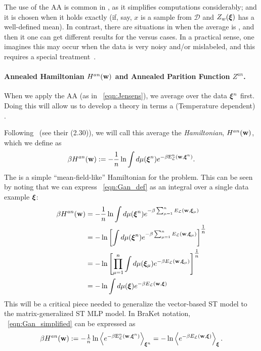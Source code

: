 The use of the AA is common in \STATMECH, as it simplifies computations considerably; and 
it is chosen when it holds exactly (if, say, $x$ is a \Typical sample from $\mathcal{D}$ and $Z_w(\boldsymbol{\xi})$ has a well-defined mean).
In contrast, there are situations in \STATMECH when the average is \ATypical, and then it one can get different results for the \Quenched versus \Annealed cases.  In a practical sense, one imagines this may occur when the data is very
noisy and/or mislabeled, and this requires a special treatment~\cite{SST92}.

\paragraph{Annealed Hamiltonian $H^{an}({\mathbf{w}})$ and Annealed Parition Function $Z^{an}$.}

When we apply the AA (as in \EQN~\ref{eqn:Jensens}), 
we average over the data $\boldsymbol{\xi}^{n}$ first. 
Doing this will allow us to develop a theory in terms a (Temperature dependent) \EffectivePotential. 

Following~\cite{SST92} (see their \EQN(2.30)), we will call this average the \emph{\Annealed Hamiltonian}, $H^{an}({\mathbf{w}})$, 
which we define as  %
  \begin{align}
   \label{eqn:Gan_def}
   \beta H^{an}({\mathbf{w}}):= - \frac{1}{n}\ln  \int d\mu(\boldsymbol{\xi}^{n})e^{-\beta\mathbf{\mathrm{E}}^{n}_{\mathcal{L}}(\mathbf{w}, \boldsymbol{\xi}^{n})}.
  \end{align}
The \AnnealedHamiltonian is a simple ``mean-field-like'' Hamiltonian for the problem.
This can be seen by noting that we can express \EQN~\ref{eqn:Gan_def} as an integral over a single data example $\boldsymbol{\xi}$:
 \begin{align}
   \nonumber
   \beta H^{an}({\mathbf{w}}) &=  - \frac{1}{n}\ln  \int d\mu(\boldsymbol{\xi}^{n})e^{-\beta\sum_{\mu=1}^{n}{E}_{\mathcal{L}}({\mathbf{w}},\boldsymbol{\xi}_{\mu})} \nonumber \\
   &=  - \ln \left[\int d\mu(\boldsymbol{\xi}^{n})e^{-\beta\sum_{\mu=1}^{n}{E}_{\mathcal{L}}({\mathbf{w}},\boldsymbol{\xi}_{\mu})}\right]^{\tfrac{1}{n}} \nonumber \\
   &=  - \ln \left[\prod_{\mu=1}^{n}\int d\mu(\boldsymbol{\xi}_{\mu})e^{-\beta{E}_{\mathcal{L}}({\mathbf{w}},\boldsymbol{\xi}_{\mu})}\right]^{\tfrac{1}{n}} \\ 
   \label{eqn:Gan_simplified}
   &=  - \ln  \int d\mu(\boldsymbol{\xi})e^{-\beta {E}_{\mathcal{L}}({\mathbf{w}},\boldsymbol{\xi})}
 \end{align}
This will be a critical piece needed to generalize the vector-based ST \Perceptron model to the matrix-generalized ST MLP model.
In BraKet notation, \EQN~\ref{eqn:Gan_simplified} can be expressed as
\begin{eqnarray*}
    \beta H^{an}({\mathbf{w}}):=  -\tfrac{1}{n}\ln\left\langle e^{-\beta\mathbf{\mathrm{E}}^{n}_{\mathcal{L}}(\mathbf{w}, \boldsymbol{\xi}^{n})}\right\rangle_{\boldsymbol{\xi}^{n}}= 
    -\ln \left\langle e^{-\beta{E}_{\mathcal{L}}({\mathbf{w}},\boldsymbol{\xi})}\right\rangle_{\boldsymbol{\xi}}.
\end{eqnarray*}

